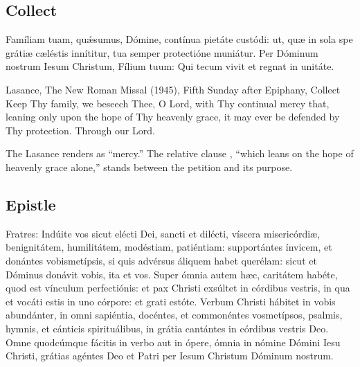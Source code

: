 \subsection{Collect}
\label{proper-collect}


\begin{latinproper}
Famíliam tuam, quǽsumus, Dómine, contínua pietáte custódi: ut, quæ in sola
spe grátiæ cæléstis innítitur, tua semper protectióne muniátur. Per Dóminum
nostrum Iesum Christum, Fílium tuum: Qui tecum vivit et regnat in unitáte.
\end{latinproper}

\begin{englishwitness}{Lasance, The New Roman Missal (1945), Fifth Sunday after Epiphany, Collect}
Keep Thy family, we beseech Thee, O Lord, with Thy continual mercy that,
leaning only upon the hope of Thy heavenly grace, it may ever be defended by
Thy protection. Through our Lord.
\end{englishwitness}

\noindent The Lasance renders  as ``mercy.'' The relative
clause , ``which leans on the
hope of heavenly grace alone,'' stands between the petition and its purpose.

\subsection{Epistle}
\label{proper-epistle}


\begin{latinproper}
Fratres: Indúite vos sicut elécti Dei, sancti et dilécti, víscera
misericórdiæ, benignitátem, humilitátem, modéstiam, patiéntiam: supportántes
ínvicem, et donántes vobismetípsis, si quis advérsus áliquem habet querélam:
sicut et Dóminus donávit vobis, ita et vos. Super ómnia autem hæc, caritátem
habéte, quod est vínculum perfectiónis: et pax Christi exsúltet in córdibus
vestris, in qua et vocáti estis in uno córpore: et grati estóte. Verbum Christi
hábitet in vobis abundánter, in omni sapiéntia, docéntes, et commonéntes
vosmetípsos, psalmis, hymnis, et cánticis spirituálibus, in grátia cantántes
in córdibus vestris Deo. Omne quodcúmque fácitis in verbo aut in ópere, ómnia
in nómine Dómini Iesu Christi, grátias agéntes Deo et Patri per Iesum Christum
Dóminum nostrum.
\end{latinproper}

